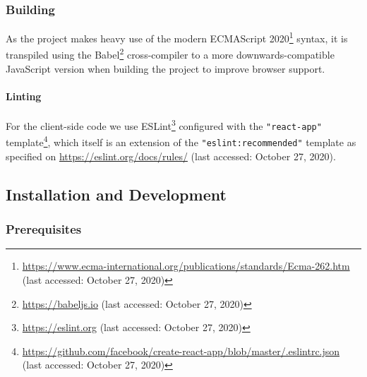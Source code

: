 \subsubsection{Building}
As the project makes heavy use of the modern ECMAScript 2020\footnote{\url{https://www.ecma-international.org/publications/standards/Ecma-262.htm} (last accessed: October 27, 2020)} syntax, it is transpiled using the Babel\footnote{\url{https://babeljs.io} (last accessed: October 27, 2020)} cross-compiler to a more downwards-compatible JavaScript version when building the project to improve browser support.

\paragraph{Linting}
For the client-side code we use ESLint\footnote{\url{https://eslint.org} (last accessed: October 27, 2020)} configured with the \texttt{"react-app"} template\footnote{\url{https://github.com/facebook/create-react-app/blob/master/.eslintrc.json} (last accessed: October 27, 2020)}, which itself is an extension of the \texttt{"eslint:recommended"} template as specified on \url{https://eslint.org/docs/rules/} (last accessed: October 27, 2020).



\subsection{Installation and Development}

\subsubsection{Prerequisites}
\label{subsub:implementation-prerequisites}

